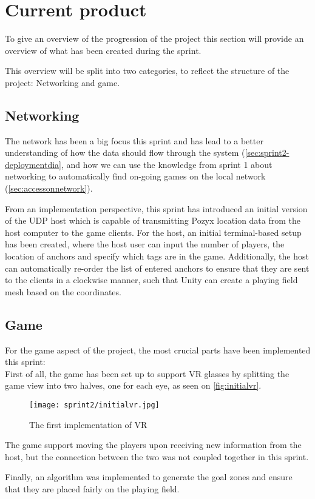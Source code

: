 \section{Current product}
To give an overview of the progression of the project this section will provide an overview of what has been created during the sprint.

This overview will be split into two categories, to reflect the structure of the project: Networking and game.

\subsection{Networking}
The network has been a big focus this sprint and has lead to a better understanding of how the data should flow through the system (\autoref{sec:sprint2-deploymentdia}, and how we can use the knowledge from sprint 1 about networking to automatically find on-going games on the local network (\autoref{sec:accessonnetwork}).

From an implementation perspective, this sprint has introduced an initial version of the UDP host which is capable of transmitting Pozyx location data from the host computer to the game clients.
For the host, an initial terminal-based setup has been created, where the host user can input the number of players, the location of anchors and specify which tags are in the game.
Additionally, the host can automatically re-order the list of entered anchors to ensure that they are sent to the clients in a clockwise manner, such that Unity can create a playing field mesh based on the coordinates.

\subsection{Game}
For the game aspect of the project, the most crucial parts have been implemented this sprint:\\
First of all, the game has been set up to support VR glasses by splitting the game view into two halves, one for each eye, as seen on \autoref{fig:initialvr}.

\begin{figure}[H]
    \centering
    \texttt{[image: sprint2/initialvr.jpg]}
    \caption{The first implementation of VR}
    \label{fig:initialvr}
\end{figure}

The game support moving the players upon receiving new information from the host, but the connection between the two was not coupled together in this sprint.

Finally, an algorithm was implemented to generate the goal zones and ensure that they are placed fairly on the playing field.